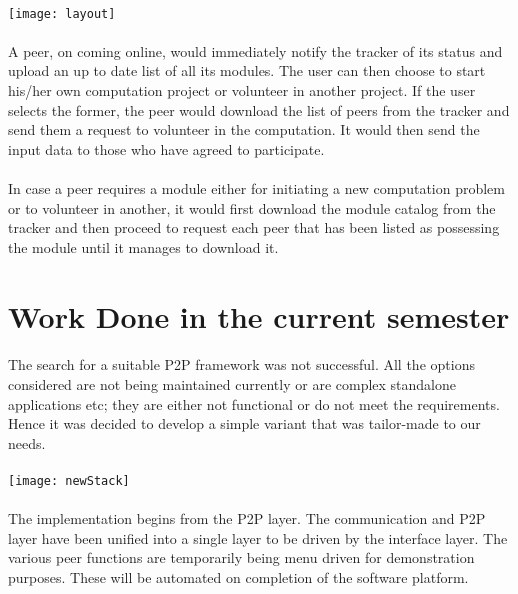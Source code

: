 \documentclass[a4paper,11pt,twocolumn]{article}
\begin{document}
\paragraph{}
\texttt{[image: layout]}
\paragraph{}
A peer, on coming online, would immediately notify the tracker of its status and upload an up to date list of all its modules. The user can then choose to start his/her own computation project or volunteer in another project. If the user selects the former, the peer would download the list of peers from the tracker and send them a request to volunteer in the computation. It would then send the input data to those who have agreed to participate.
\paragraph{}
In case a peer requires a module either for initiating a new computation problem or to volunteer in another, it would first download the module catalog from the tracker and then proceed to request each peer that has been listed as possessing the module until it manages to download it.
\section{Work Done in the current semester}
\paragraph{}
The search for a suitable P2P framework was not successful. All the options considered are not being maintained currently or are complex standalone applications etc;  they are either not functional or do not meet the requirements. Hence it was decided to develop a simple variant that was tailor-made to our needs.
\paragraph{}
\texttt{[image: newStack]}
\paragraph{}
The implementation begins from the P2P layer. The communication and P2P layer have been unified into a single layer to be driven by the interface layer. The various peer functions are temporarily being menu driven for demonstration purposes. These will be automated on completion of the software platform.
\end{document}
